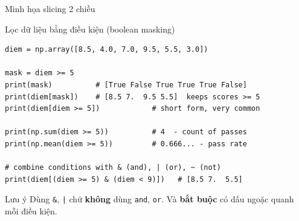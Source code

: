 \documentclass[11pt]{beamer}
\begin{document}
\begin{frame}{Minh họa slicing 2 chiều}
\begin{center}
\end{center}
\end{frame}

\begin{frame}[fragile]{Lọc dữ liệu bằng điều kiện (boolean masking)}
\begin{lstlisting}
diem = np.array([8.5, 4.0, 7.0, 9.5, 5.5, 3.0])

mask = diem >= 5
print(mask)          # [True False True True True False]
print(diem[mask])    # [8.5 7.  9.5 5.5]  keeps scores >= 5
print(diem[diem >= 5])            # short form, very common

print(np.sum(diem >= 5))          # 4  - count of passes
print(np.mean(diem >= 5))         # 0.666... - pass rate

# combine conditions with & (and), | (or), ~ (not)
print(diem[(diem >= 5) & (diem < 9)])   # [8.5 7.  5.5]
\end{lstlisting}
\begin{alertblock}{Lưu ý}
Dùng \texttt{\&}, \texttt{|} chứ \textbf{không} dùng \texttt{and}, \texttt{or}. Và \textbf{bắt buộc} có dấu ngoặc quanh mỗi điều kiện.
\end{alertblock}
\end{frame}
\end{document}
